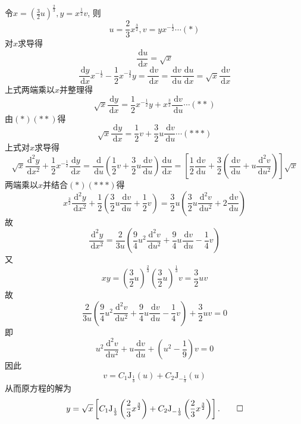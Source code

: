 \documentclass[titlepage,11pt,a4paper,twoside]{report}
\makeatletter
\newcommand\diff{\,\mathrm{d}}
\newcommand\rmJ{\mathrm{J}}
\newenvironment{solve}{\par
	\pushQED{\qed}%
	\normalfont \topsep1\p@\@plus6\p@\relax
	\trivlist
	\item\relax
	{\hspace*{\parindent}{\heiti 解}\@addpunct{:}}\hspace\labelsep\ignorespaces
}{%
	\popQED\endtrivlist\@endpefalse
}
\makeatother
\begin{document}
\begin{solve} 令$x=\left(\frac{3}{2}u\right)^{\frac{2}{3}},y=x^{\frac{1}{2}}v$, 则
\[u=\frac{2}{3}x^{\frac{3}{2}},v=yx^{-\frac{1}{2}}\cdots(*)\]
对$x$求导得
\[\frac{\diff u}{\diff x}=\sqrt{x}\]
\[\frac{\diff y}{\diff x}x^{-\frac{1}{2}}-\frac{1}{2}x^{-\frac{3}{2}}y=\frac{\diff v}{\diff x}=\frac{\diff v}{\diff u}\frac{\diff u}{\diff x}=\sqrt{x}\frac{\diff v}{\diff x}\]
上式两端乘以$x$并整理得
\[\sqrt{x}\frac{\diff y}{\diff x}=\frac{1}{2}x^{-\frac{1}{2}}y+x^{\frac{3}{2}}\frac{\diff v}{\diff u}\cdots(**)\]
由$(*)(**)$得
\[\sqrt{x}\frac{\diff y}{\diff x}=\frac{1}{2}v+\frac{3}{2}u\frac{\diff v}{\diff u}\cdots(***)\]
上式对$x$求导得
\[\sqrt{x}\frac{\diff^2y}{\diff x^2}+\frac{1}{2}x^{-\frac{1}{2}}\frac{\diff y}{\diff x}=\frac{\diff}{\diff u}\left(\frac{1}{2}v+\frac{3}{2}u\frac{\diff v}{\diff u}\right)\frac{\diff u}{\diff x}=\left[\frac{1}{2}\frac{\diff v}{\diff u}+\frac{3}{2}\left(\frac{\diff v}{\diff u}+u\frac{\diff^2v}{\diff u^2}\right)\right]\sqrt{x}\]
两端乘以$x$并结合$(*)(***)$得
\[x^{\frac{3}{2}}\frac{\diff^2y}{\diff x^2}+\frac{1}{2}\left(\frac{3}{2}u\frac{\diff v}{\diff u}+\frac{1}{2}v\right)=\frac{3}{2}u\left(\frac{3}{2}u\frac{\diff^2v}{\diff u^2}+2\frac{\diff v}{\diff u}\right)\]
故
\[\frac{\diff^2y}{\diff x^2}=\frac{2}{3u}\left(\frac{9}{4}u^2\frac{\diff^2v}{\diff u^2}+\frac{9}{4}u\frac{\diff v}{\diff u}-\frac{1}{4}v\right)\]
又\[xy=\left(\frac{3}{2}u\right)^{\frac{2}{3}}\left(\frac{3}{2}u\right)^{\frac{1}{3}}v=\frac{3}{2}uv\]
故
\[\frac{2}{3u}\left(\frac{9}{4}u^2\frac{\diff^2v}{\diff u^2}+\frac{9}{4}u\frac{\diff v}{\diff u}-\frac{1}{4}v\right)+\frac{3}{2}uv=0\]
即
\[u^2\frac{\diff^2v}{\diff u^2}+u\frac{\diff v}{\diff u}+\left(u^2-\frac{1}{9}\right)v=0\]
因此
\[v=C_1\rmJ_{\frac{1}{3}}(u)+C_2\rmJ_{-\frac{1}{3}}(u)\]
从而原方程的解为
\[y=\sqrt{x}\left[C_1\rmJ_{\frac{1}{3}}\left(\frac{2}{3}x^{\frac{3}{2}}\right)+C_2\rmJ_{-\frac{1}{3}}\left(\frac{2}{3}x^{\frac{3}{2}}\right)\right].\qedhere\]
\end{solve}
\end{document}
